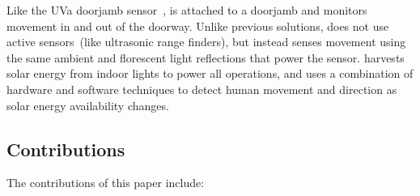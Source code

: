 Like the UVa doorjamb sensor~\cite{hnat2012doorjamb}, \sysname is attached to a doorjamb and monitors movement in and out of the doorway.
Unlike previous solutions, \sysname does not use active sensors~(like ultrasonic range finders), but instead senses movement using the same ambient and florescent light reflections that power the sensor.
\sysname harvests solar energy from indoor lights to power all operations, and uses a combination of hardware and software techniques to detect human movement and direction as solar energy availability changes.




\subsection*{Contributions}

The contributions of this paper include:

